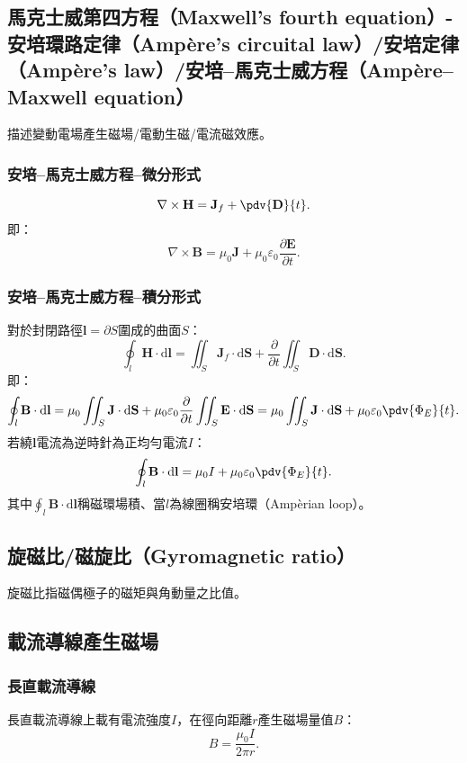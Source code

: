 \documentclass[a4paper,12pt]{report}
\begin{document}
\begin{itemize}
\subsection{馬克士威第四方程（Maxwell's fourth equation）-安培環路定律（Ampère's circuital law）/安培定律（Ampère's law）/安培–馬克士威方程（Ampère–Maxwell equation）}
描述變動電場產生磁場/電動生磁/電流磁效應。
\subsubsection{安培–馬克士威方程–微分形式}
\[\nabla \times \mathbf{H} = \mathbf{J}_f + \pdv{\mathbf{D}}{t}.\]
即：
\[\nabla\times\mathbf{B}=\mu_0\mathbf{J}+\mu_0\varepsilon_0\frac{\partial\mathbf{E}}{\partial t}.\]
\subsubsection{安培–馬克士威方程–積分形式}
對於封閉路徑$\mathbf{l}=\partial S$圍成的曲面$S$：
\[\oint_{l}\mathbf{H}\cdot\mathrm{d}\mathbf{l}=\iint_S\mathbf{J}_f\cdot\mathrm{d}\mathbf{S}+\frac{\partial}{\partial t}\iint_S\mathbf{D}\cdot\mathrm{d}\mathbf{S}.\]
即：
\[\oint_{l}\mathbf{B}\cdot\mathrm{d}\mathbf{l}=\mu_0\iint_S\mathbf{J}\cdot\mathrm{d}\mathbf{S}+\mu_0\varepsilon_0\frac{\partial}{\partial t}\iint_S\mathbf{E}\cdot\mathrm{d}\mathbf{S}=\mu_0\iint_S\mathbf{J}\cdot\mathrm{d}\mathbf{S}+\mu_0\varepsilon_0\pdv{\Phi_E}{t}.\]
若繞$\mathbf{l}$電流為逆時針為正均勻電流$I$：
\[\oint_{l}\mathbf{B}\cdot\mathrm{d}\mathbf{l}=\mu_0I+\mu_0\varepsilon_0\pdv{\Phi_E}{t}.\]
其中$\oint_{l}\mathbf{B}\cdot\mathrm{d}\mathbf{l}$稱磁環場積、當$l$為線圈稱安培環（Ampèrian loop）。
\subsection{旋磁比/磁旋比（Gyromagnetic ratio）}
旋磁比指磁偶極子的磁矩與角動量之比值。
\subsection{載流導線產生磁場}
\subsubsection{長直載流導線}
長直載流導線上載有電流強度$I$，在徑向距離$r$產生磁場量值$B$：
\[B=\frac{\mu_0I}{2\pi r}.\]

\end{itemize}
\end{document}
